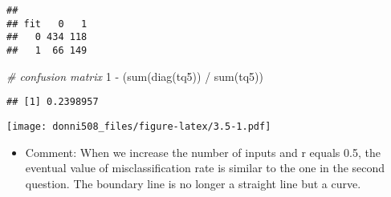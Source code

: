 \documentclass[
]{article}
\newenvironment{Shaded}{\begin{snugshade}}{\end{snugshade}}
\newcommand{\AttributeTok}[1]{\textcolor[rgb]{0.77,0.63,0.00}{#1}}
\newcommand{\CommentTok}[1]{\textcolor[rgb]{0.56,0.35,0.01}{\textit{#1}}}
\newcommand{\DecValTok}[1]{\textcolor[rgb]{0.00,0.00,0.81}{#1}}
\newcommand{\FunctionTok}[1]{\textcolor[rgb]{0.00,0.00,0.00}{#1}}
\newcommand{\NormalTok}[1]{#1}
\newcommand{\OtherTok}[1]{\textcolor[rgb]{0.56,0.35,0.01}{#1}}
\newcommand{\SpecialCharTok}[1]{\textcolor[rgb]{0.00,0.00,0.00}{#1}}
\newcommand{\StringTok}[1]{\textcolor[rgb]{0.31,0.60,0.02}{#1}}
\providecommand{\tightlist}{%
  \setlength{\itemsep}{0pt}\setlength{\parskip}{0pt}}
\begin{document}
\begin{verbatim}
##    
## fit   0   1
##   0 434 118
##   1  66 149
\end{verbatim}

\begin{Shaded}
\begin{Highlighting}[]
\CommentTok{\# confusion matrix}
\DecValTok{1} \SpecialCharTok{{-}}\NormalTok{ (}\FunctionTok{sum}\NormalTok{(}\FunctionTok{diag}\NormalTok{(tq5)) }\SpecialCharTok{/} \FunctionTok{sum}\NormalTok{(tq5))}
\end{Highlighting}
\end{Shaded}

\begin{verbatim}
## [1] 0.2398957
\end{verbatim}

\begin{Shaded}
\end{Shaded}

\texttt{[image: donni508\_files/figure-latex/3.5-1.pdf]}

\begin{itemize}
\tightlist
\item
  Comment: When we increase the number of inputs and r equals 0.5, the
  eventual value of misclassification rate is similar to the one in the
  second question. The boundary line is no longer a straight line but a
  curve.
\end{itemize}
\end{document}
